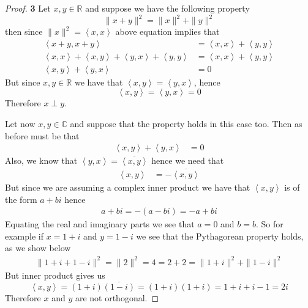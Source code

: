 \documentclass[11pt]{article}
\newcommand{\R}{\mathbb{R}}
\newcommand{\C}{\mathbb{C}}
\newcommand{\inprd}[1]{\left\langle{#1}\right\rangle}
\theoremstyle{definition}
\begin{document}
\cleardoublepage
\begin{proof}{\textbf{3}}
Let $x,y \in \R$ and suppose we have the following property
$$\|x + y\|^2 = \|x\|^2 + \|y\|^2$$
then since $\|x\|^2 = \inprd{x,x}$ above equation implies that
\begin{align*}
    \inprd{x +y, x +y} &= \inprd{x,x} + \inprd{y,y}\\
    \inprd{x, x} + \inprd{x,y} + \inprd{y,x} + \inprd{y,y}
    &=\inprd{x,x} + \inprd{y,y}\\
    \inprd{x,y} + \inprd{y,x} &= 0
\end{align*}
But since $x,y \in \R$ we have that $\inprd{x,y} = \inprd{y,x}$, hence
$$\inprd{x,y} = \inprd{y,x} = 0$$
Therefore $x \perp y$.

Let now $x,y \in \C$ and suppose that the property holds in this case too.
Then as before must be that
\begin{align*}
    \inprd{x,y} + \inprd{y,x} &= 0
\end{align*}
Also, we know that $\inprd{y,x} = \overline{\inprd{x,y}}$ hence
we need that
\begin{align*}
    \inprd{x,y} &= -\overline{\inprd{x,y}}
\end{align*}
But since we are assuming a complex inner product we have that $\inprd{x,y}$
is of the form $a + bi$ hence
\begin{align*}
    a + bi = -(a - bi) = -a + bi
\end{align*}
Equating the real and imaginary parts we see that $a = 0$ and $b = b$.
So for example if $x = 1 + i$ and $y = 1 - i$ we see that the Pythagorean
property holds, as we show below
\begin{align*}
    \|1 + i + 1 -i\|^2 = \|2\|^2
    = 4 = 2 + 2 = \|1 + i\|^2 + \|1 - i\|^2 
\end{align*}
But inner product gives us
$$\inprd{x,y} = (1 + i)\overline{(1 - i)} = (1 + i)(1 + i)
= 1 + i + i -1 = 2i$$
Therefore $x$ and $y$ are not orthogonal.
\end{proof}
\end{document}
